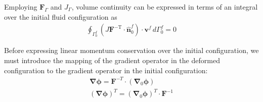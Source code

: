 \documentclass[sn-mathphys,Numbered]{sn-jnl}%
\newcommand{\bb}{\boldsymbol}
\begin{document}
Employing $\bb{F}_{\Gamma}$ and $J_\Gamma$, volume continuity can be expressed in terms of an integral over the initial fluid configuration as
\begin{eqnarray} \label{eqn:continuity_initial}
	\oint_{\Gamma^f_0}  \left( J \bb{F}^{-\text{T}} \cdot \hat{\bb{n}}_0^f \right) \cdot \bb{v}^f \, d\Gamma^f_0 = 0
\end{eqnarray}

Before expressing linear momentum conservation over the initial configuration, we must introduce the mapping of the gradient operator in the deformed configuration to the gradient operator in the initial configuration:
\begin{eqnarray}
	\bb{\nabla} \bb{\phi} = \bb{F}^{-T} \cdot \left( \bb{\nabla}_0 \bb{\phi} \right) \\
	\left( \bb{\nabla} \bb{\phi} \right)^T = \left( \bb{\nabla}_0 \bb{\phi} \right)^T \cdot  \bb{F}^{-1} 
\end{eqnarray}
\end{document}
